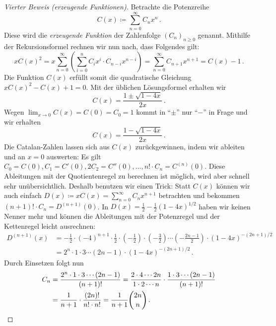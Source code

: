 \begin{proof}[Vierter Beweis \textmd{(\emph{erzeugende Funktionen})}]
	Betrachte die Potenzreihe
	\begin{equation*}
		C(x)\coloneqq\sum_{n= 0}^{\infty}C_nx^n\,.
	\end{equation*}
	Diese wird die \emph{erzeugende Funktion} der Zahlenfolge $(C_n)_{n\geqslant 0}$ genannt. Mithilfe der Rekursionsformel rechnen wir nun nach, dass Folgendes gilt:
	\begin{equation*}
		xC(x)^2=x\sum_{n=0}^\infty\left(\sum_{i=0}^nC_ix^i\cdot C_{n-i}x^{n-i}\right)=\sum_{n=0}^\infty C_{n+1}x^{n+1}=C(x)-1\,.
	\end{equation*}
	Die Funktion $C(x)$ erfüllt somit die quadratische Gleichung $xC(x)^2-C(x)+1=0$. Mit der üblichen Lösungsformel erhalten wir
	\begin{equation*}
		C(x)=\frac{1\pm\sqrt{1-4x}}{2x}\,.
	\end{equation*}
	Wegen $\lim_{x\to0}C(x)=C(0)=C_0=1$ kommt in \enquote{$\pm$} nur \enquote{$-$} in Frage und wir erhalten
	\begin{equation*}
		C(x)=\frac{1-\sqrt{1-4x}}{2x}\,.
	\end{equation*}
	Die Catalan-Zahlen lassen sich aus $C(x)$ zurückgewinnen, indem wir ableiten und an $x=0$ auswerten: Es gilt $C_0=C(0),C_1=C'(0),2C_2=C''(0),\dotsc,n!\cdot C_n=C^{(n)}(0)$. Diese Ableitungen mit der Quotientenregel zu berechnen ist möglich, wird aber schnell sehr unübersichtlich. Deshalb benutzen wir einen Trick: Statt $C(x)$ können wir auch einfach $D(x)\coloneqq xC(x)=\sum_{n=0}^\infty C_nx^{n+1}$ betrachten und bekommen $(n+1)!\cdot C_n=D^{(n+1)}(0)$. In $D(x)=\frac12-\frac12(1-4x)^{1/2}$ haben wir keinen Nenner mehr und können die Ableitungen mit der Potenzregel und der Kettenregel leicht ausrechnen:
	\begin{align*}
		D^{(n+1)}(x)&=-\frac12\cdot (-4)^{n+1}\cdot \frac12\cdot\left(-\frac12\right)\cdot\left(-\frac{3}{2}\right)\dotsm\left(-\frac{2n-1}{2}\right)\cdot\left(1-4x\right)^{-(2n+1)/2}\\
		&=2^{n}\cdot 1\cdot 3\dotsm(2n-1)\cdot \left(1-4x\right)^{-(2n+1)/2}\,.
	\end{align*}
	Durch Einsetzen folgt nun
	\begin{align*}
		C_n&=\frac{2^{n}\cdot 1\cdot 3\dotsm(2n-1)}{(n+1)!}=\frac{2\cdot 4\dotsm 2n}{1\cdot 2\dotsm n}\cdot\frac{1\cdot 3\dotsm (2n-1)}{(n+1)!}\\
		&=\frac{1}{n+1}\cdot\frac{(2n)!}{n!\cdot n!}=\frac{1}{n+1}\binom{2n}{n}\,.\qedhere
	\end{align*}
\end{proof}
